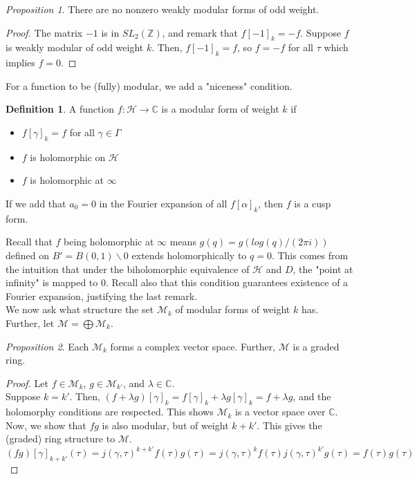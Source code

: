 \documentclass[11pt]{article}
\theoremstyle{plain}
\theoremstyle{definition}
\newtheorem{definition}{Definition}[section]
\theoremstyle{example}
\theoremstyle{remark}
\theoremstyle{lemma}
\theoremstyle{proposition}
\newtheorem{proposition}{Proposition}[section]
\theoremstyle{Problem}
\theoremstyle{Solution}
\theoremstyle{theorem}
\theoremstyle{corollary}
\begin{document}
\begin{proposition}
There are no nonzero weakly modular forms of odd weight.
\end{proposition}
\begin{proof}
The matrix $-1$ is in $SL_2(\mathbb{Z})$, and remark that $f[-1]_k = -f$. Suppose $f$ is weakly modular of odd weight $k$. Then, $f[-1]_k = f$, so $f = -f$ for all $\tau$ which implies $f = 0$.
\end{proof}
For a function to be (fully) modular, we add a "niceness" condition.
\begin{definition}
A function $f: \mathcal{H} \to \mathbb{C}$ is a modular form of weight $k$ if
\begin{itemize}
\item $f[\gamma]_k = f$ for all $\gamma \in \Gamma$
\item $f$ is holomorphic on $\mathcal{H}$
\item $f$ is holomorphic at $\infty$
\end{itemize}
If we add that $a_0 = 0$ in the Fourier expansion of all $f[\alpha]_k$, then $f$ is a cusp form.
\end{definition}

Recall that $f$ being holomorphic at $\infty$ means $g(q) = g(log(q)/(2\pi i))$ defined on $B' = B(0,1)\backslash {0}$ extends holomorphically to $q=0$. This comes from the intuition that under the biholomorphic equivalence of $\mathcal{H}$ and $D$, the "point at infinity" is mapped to $0$. Recall also that this condition guarantees existence of a Fourier expansion, justifying the last remark.\\

We now ask what structure the set $\mathcal{M}_k$ of modular forms of weight $k$ has. Further, let $\mathcal{M} = \bigoplus \mathcal{M}_k$.
\begin{proposition} %
Each $\mathcal{M}_k$ forms a complex vector space. Further, $\mathcal{M}$ is a graded ring.
\end{proposition}
\begin{proof} 
Let $f\in \mathcal{M}_k$, $g\in \mathcal{M}_{k'}$, and $\lambda\in \mathbb{C}$.\\
Suppose $k=k'$. Then, $(f+\lambda g)[\gamma]_k = f[\gamma]_k + \lambda g[\gamma]_k = f + \lambda g$, and the holomorphy conditions are respected. This shows $\mathcal{M}_k$ is a vector space over $\mathbb{C}$.\\
Now, we show that $fg$ is also modular, but of weight $k+k'$. This gives the (graded) ring structure to $\mathcal{M}$. 
$$(fg)[\gamma]_{k+k'}(\tau) = j(\gamma, \tau)^{k+k'}f(\tau)g(\tau) = j(\gamma,\tau)^kf(\tau) j(\gamma,\tau)^{k'} g(\tau) = f(\tau)g(\tau)$$
\end{proof}
\end{document}
